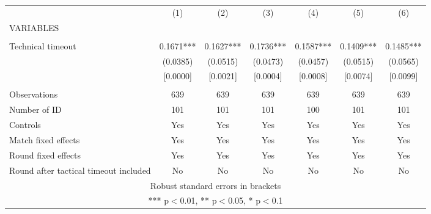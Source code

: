 \documentclass[]{article}
\begin{document}
\begin{tabular}{lcccccc} \hline
 & (1) & (2) & (3) & (4) & (5) & (6) \\
VARIABLES &  &  &  &  &  &  \\ \hline
 &  &  &  &  &  &  \\
Technical timeout & 0.1671*** & 0.1627*** & 0.1736*** & 0.1587*** & 0.1409*** & 0.1485*** \\
 & (0.0385) & (0.0515) & (0.0473) & (0.0457) & (0.0515) & (0.0565) \\
 & [0.0000] & [0.0021] & [0.0004] & [0.0008] & [0.0074] & [0.0099] \\
 &  &  &  &  &  &  \\
Observations & 639 & 639 & 639 & 639 & 639 & 639 \\
Number of ID & 101 & 101 & 101 & 100 & 101 & 101 \\
Controls & Yes & Yes & Yes & Yes & Yes & Yes \\
Match fixed effects & Yes & Yes & Yes & Yes & Yes & Yes \\
Round fixed effects & Yes & Yes & Yes & Yes & Yes & Yes \\
 Round after tactical timeout included & No & No & No & No & No & No \\ \hline
\multicolumn{7}{c}{ Robust standard errors in brackets} \\
\multicolumn{7}{c}{ *** p$<$0.01, ** p$<$0.05, * p$<$0.1} \\
\end{tabular}
\end{document}
